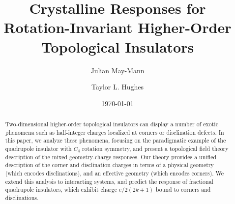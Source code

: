 \documentclass[%
 reprint,
 amsmath,amssymb,
 aps,
]{revtex4-1}
\begin{document}
\def\ppnumber{\vbox{\baselineskip14pt
}}

\def\ppdate{%
} \date{\today}

\title{\bf Crystalline Responses for Rotation-Invariant Higher-Order Topological Insulators}
\author{Julian May-Mann}
\author{Taylor L. Hughes}


\begin{abstract}
Two-dimensional higher-order topological insulators can display a number of exotic phenomena such as half-integer charges localized at corners or disclination defects. In this paper, we analyze these phenomena, focusing on the paradigmatic example of the quadrupole insulator with $C_4$ rotation symmetry, and present a topological field theory description of the mixed geometry-charge responses. Our theory provides a unified description of the corner and disclination charges in terms of a physical geometry (which encodes disclinations), and an effective geometry (which encodes corners). We extend this analysis to interacting systems, and predict the response of fractional quadrupole insulators, which exhibit charge $e/2(2k+1)$ bound to corners and disclinations.
\end{abstract}

\maketitle



\bigskip
\newpage
\end{document}
